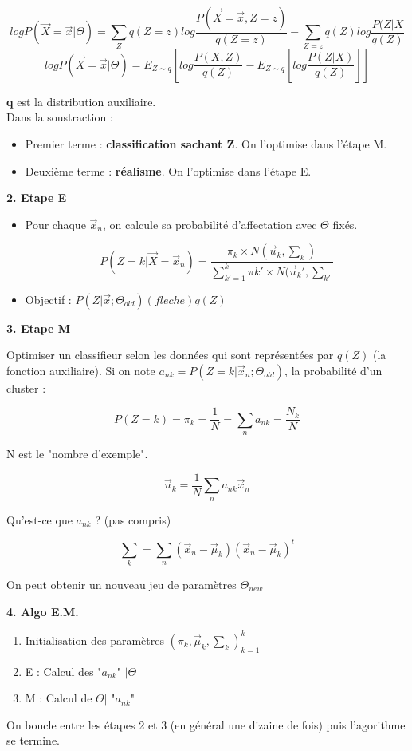 \documentclass{article}
\begin{document}
\[ log P(\vec{X} = \vec{x} | \Theta) = \sum_Z q(Z = z) log \frac{P(\vec{X} = \vec{x}, Z = z)}{q(Z = z)} - \sum_{Z = z} q(Z) log \frac{P(Z | X}{q(Z)} \]
\[ log P(\vec{X} = \vec{x} | \Theta) = E_{Z \sim q} [ log \frac{P(X, Z)}{q(Z)} - E_{Z \sim q} [log \frac{P(Z | X)}{q(Z)}]  ] \]

\textbf{q} est la distribution auxiliaire. \\
Dans la soustraction : 
\begin{itemize}
\item Premier terme : \textbf{classification sachant Z}. On l'optimise dans l'étape M.
\item Deuxième terme : \textbf{réalisme}. On l'optimise dans l'étape E.
\end{itemize}

\textbf{2. Etape E}

\begin{itemize}

\item Pour chaque $\vec{x}_n$, on calcule sa probabilité d'affectation avec $\Theta$ fixés.

\[ P(Z = k | \vec{X} = \vec{x}_n) = \frac{\pi_k \times N(\vec{u}_k, \sum_k)}{\sum_{k' = 1}^{k} \pi k' \times N(\vec{u}_k', \sum_{k'}  } \]

\item Objectif : $P(Z | \vec{x}; \Theta_{old}) (fleche) q(Z)$

\end{itemize}

\textbf{3. Etape M}

Optimiser un classifieur selon les données qui sont représentées par $q(Z)$ (la fonction auxiliaire). Si on note $a_{nk} = P(Z = k | \vec{x}_n; \Theta_{old})$,
la probabilité d'un cluster :

\[ P(Z = k) = \pi_k = \frac{1}{N} = \sum_n a_{nk} = \frac{N_k}{N} \] 

N est le "nombre d'exemple".

\[ \vec{u}_k = \frac{1}{N} \sum_n a_{nk} \vec{x}_n \]

Qu'est-ce que $a_{nk}$ ? (pas compris)

\[ \sum_k = \sum_n (\vec{x}_n - \vec{\mu}_k) (\vec{x}_n - \vec{\mu}_k) ^{t}  \]

On peut obtenir un nouveau jeu de paramètres $\Theta_{new}$

\textbf{4. Algo E.M.}

\begin{enumerate}
\item Initialisation des paramètres $(\pi_k, \vec{\mu}_k, \sum_k)_{k = 1}^{k}$
\item E : Calcul des "$a_{nk}$" $ | \Theta$
\item M : Calcul de $\Theta | $ "$a_{nk}$"
\end{enumerate}

On boucle entre les étapes 2 et 3 (en général une dizaine de fois) puis l'agorithme se termine.
\end{document}
